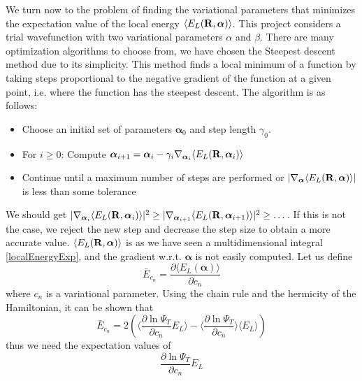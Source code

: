 \documentclass[english, a4paper]{article}
\begin{document}
We turn now to the problem of finding the variational parameters that minimizes the expectation value
of the local energy $\langle E_L({\bf R}, \boldsymbol{\alpha}) \rangle$. This project considers a trial wavefunction
with two variational parameters $\alpha$ and  $\beta$. 
There are many optimization algorithms to choose from, we have chosen the Steepest 
descent method due to its simplicity. This method finds a local minimum of a function by taking steps proportional 
to the negative gradient of the function at a given point, i.e. where the function has the steepest descent.
The algorithm is as follows:
\begin{itemize}
 \item Choose an initial set of parameters $\boldsymbol{\alpha}_0$ and step length $\gamma_0$.
 \item For $i \geq 0$: Compute $\boldsymbol{\alpha}_{i+1} = \boldsymbol{\alpha}_i - \gamma_i 
 \nabla_{\boldsymbol{\alpha}_i} \langle E_L({\bf R}, \boldsymbol{\alpha}_i) \rangle$
 \item Continue until a maximum number of steps are performed or 
 $|\nabla_{\boldsymbol{\alpha}} \langle E_L({\bf R}, \boldsymbol{\alpha}) \rangle|$ is
       less than some tolerance
\end{itemize}
We should get $|\nabla_{\boldsymbol{\alpha}_i}\langle E_L({\bf R}, 
\boldsymbol{\alpha}_i) \rangle|^2 \geq |\nabla_{\boldsymbol{\alpha}_{i+1}}\langle 
E_L({\bf R}, \boldsymbol{\alpha}_{i+1}) \rangle|^2 \geq \dots$.
If this is not the case, we reject the new step and decrease the step size to obtain a more
accurate value. 
$\langle E_L({\bf R}, \boldsymbol{\alpha}) \rangle$ is as we have seen a multidimensional integral 
\eqref{localEnergyExp}, 
and the gradient w.r.t. $\boldsymbol{\alpha}$
is not easily computed.
Let us define
\begin{equation}
 \bar{E}_{c_n} = \frac{\partial \langle E_L(\boldsymbol{\alpha}) \rangle}{\partial c_n}
\end{equation}
where $c_n$ is a variational parameter.
Using the chain rule and the hermicity of the Hamiltonian,
it can be shown that
\begin{equation}
 \bar{E}_{c_n} = 2 \left( \Bigr\langle \frac{\partial \ln{\Psi_T}}{\partial c_n} E_L 
 \Bigr\rangle 
 - \Bigr\langle \frac{\partial \ln{\Psi_T}}{\partial c_n}\Bigr\rangle \langle E_L \rangle   \right)
 \label{localEnergyParameters}
\end{equation}
thus we need the expectation values of
\begin{equation}
 \frac{\partial \ln{\Psi_T}}{\partial c_n} E_L
 \label{sampleOptimize1}
\end{equation}
\end{document}
